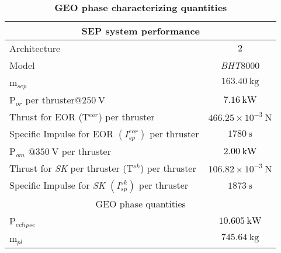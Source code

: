 \begin{table*}[htp]
\footnotesize
\centering
\caption{\textbf{GEO phase characterizing quantities}}
\label{tab:geophasecharacterizingquantities}
\begin{tabular}{lc}
\toprule
\toprule
\multicolumn{2}{c}{SEP system performance}\\
\midrule
{Architecture}&\textcolor{black}{$2$}\\
Model&\textit{BHT}$8000$\\
m$_{\scriptstyle{sep}}$&$163.40~\si{\kilo\gram}$\\
{P$_{\scriptstyle{or}}$ per thruster$@250~\si{\volt}$}&\textcolor{black}{$7.16~\si{\kilo\watt}$}\\ 
Thrust for EOR (T$^{\scriptstyle{eor}}$) per thruster &$466.25\times10^{-3}~\si{\newton}$\\
Specific Impulse for EOR $\left(I_{\scriptstyle{sp}}^{\scriptstyle{eor}}\right)$ per thruster&$1780~\si{\second}$\\
{P$_{\scriptstyle{om}}$ $@350~\si{\volt}$ per thruster}&\textcolor{black}{$2.00~\si{\kilo\watt}$}\\
Thrust for \textit{SK} per thruster (T$^{\scriptstyle{sk}}$) per thruster&$106.82\times10^{-3}~\si{\newton}$\\
Specific Impulse for \textit{SK} $\left(I_{\scriptstyle{sp}}^{\scriptstyle{sk}}\right)$ per thruster&$1873~\si{\second}$\\
\midrule
\multicolumn{2}{c}{\textsc{GEO} phase quantities}\\
\midrule
{P$_{\scriptstyle{eclipse}}$}&\textcolor{black}{$10.605~\si{\kilo\watt}$}\\
m$_{\scriptstyle{pl}}$&$745.64~\si{\kilo\gram}$\\
\bottomrule
\bottomrule
\end{tabular}
\end{table*}
